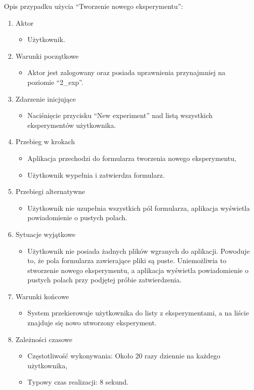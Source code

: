 Opis przypadku użycia \enquote{Tworzenie nowego eksperymentu}:
\begin{enumerate}
\item  Aktor
	\begin{itemize}
		\item Użytkownik. 
	\end{itemize}
\item Warunki początkowe
	\begin{itemize}
		\item Aktor jest zalogowany oraz posiada uprawnienia przynajmniej na poziomie \enquote{2\_exp}.
	\end{itemize}
\item Zdarzenie inicjujące
	\begin{itemize}
		\item Naciśnięcie przycisku \enquote{New experiment} nad listą wszystkich eksperymentów użytkownika.
	\end{itemize}
\item Przebieg w krokach
	\begin{itemize}
		\item Aplikacja przechodzi do formularza tworzenia nowego eksperymentu,
		\item Użytkownik wypełnia i zatwierdza formularz.
	\end{itemize}
\item Przebiegi alternatywne
	\begin{itemize}
		\item  Użytkownik nie uzupełnia wszystkich pól formularza, aplikacja wyświetla powiadomienie o pustych polach.
	\end{itemize}
\item Sytuacje wyjątkowe
	\begin{itemize}
		\item  Użytkownik nie posiada żadnych plików wgranych do aplikacji. Powoduje to, że pola formularza zawierające pliki są puste. Uniemożliwia to stworzenie nowego eksperymentu, a aplikacja wyświetla powiadomienie o pustych polach przy podjętej próbie zatwierdzenia.
	\end{itemize}
\item Warunki końcowe
	\begin{itemize}
		\item  System przekierowuje użytkownika do listy z eksperymentami, a na liście znajduje się nowo utworzony eksperyment.
	\end{itemize}
\item Zależności czasowe
	\begin{itemize}
		\item  Częstotliwość wykonywania: Około 20 razy dziennie na każdego użytkownika,
		\item Typowy czas realizacji: 8 sekund.
	\end{itemize}
\end{enumerate}

